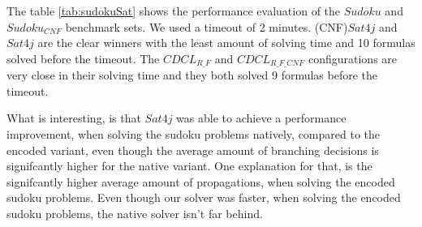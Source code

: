The table \ref{tab:sudokuSat} shows the performance evaluation of the $Sudoku$ and $Sudoku_{CNF}$ benchmark sets. We used a timeout of 2 minutes. (CNF)$Sat4j$ and $Sat4j$ are the clear winners with the least amount of solving time and 10 formulas solved before the timeout. The $CDCL_{R\_F}$ and $CDCL_{R\_F\_CNF}$ configurations are very close in their solving time and they both solved 9 formulas before the timeout.

What is interesting, is that $Sat4j$ was able to achieve a performance improvement, when solving the sudoku problems natively, compared to the encoded variant, even though the average amount of branching decisions is signifcantly higher for the native variant. One explanation for that, is the signifcantly higher average amount of propagations, when solving the encoded sudoku problems. Even though our solver was faster, when solving the encoded sudoku problems, the native solver isn't far behind.